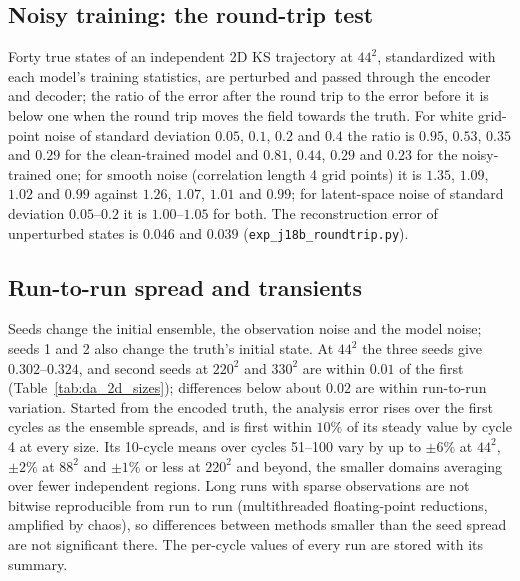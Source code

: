 \subsection{Noisy training: the round-trip test}
\label{app:da_roundtrip}

Forty true states of an independent 2D KS trajectory at $44^2$, standardized with each model's training
statistics, are perturbed and passed through the encoder and decoder; the ratio of the error after the
round trip to the error before it is below one when the round trip moves the field towards the truth.
For white grid-point noise of standard deviation $0.05$, $0.1$, $0.2$ and $0.4$ the ratio is $0.95$, $0.53$, $0.35$
and $0.29$ for the clean-trained model and $0.81$, $0.44$, $0.29$ and $0.23$ for the noisy-trained one; for
smooth noise (correlation length 4 grid points) it is $1.35$, $1.09$, $1.02$ and $0.99$ against $1.26$, $1.07$,
$1.01$ and $0.99$; for latent-space noise of standard deviation $0.05$--$0.2$ it is $1.00$--$1.05$ for both. The
reconstruction error of unperturbed states is $0.046$ and $0.039$ (\texttt{exp\_j18b\_roundtrip.py}).

\subsection{Run-to-run spread and transients}
\label{app:da_tuning}

Seeds change the initial ensemble, the observation noise and the model noise; seeds 1 and 2 also
change the truth's initial state. At $44^2$ the three seeds give $0.302$--$0.324$, and second seeds at $220^2$
and $330^2$ are within $0.01$ of the first (Table~\ref{tab:da_2d_sizes}); differences below about $0.02$ are
within run-to-run variation. Started from the encoded truth, the analysis error rises over the first
cycles as the ensemble spreads, and is first within $10\%$ of its steady value by cycle 4 at every size.
Its 10-cycle means over cycles 51--100 vary by up to $\pm6\%$ at $44^2$, $\pm2\%$ at $88^2$ and $\pm1\%$ or less at $220^2$ and
beyond, the smaller domains averaging over fewer independent regions. Long runs with sparse
observations are not bitwise reproducible from run to run (multithreaded floating-point reductions,
amplified by chaos), so differences between methods smaller than the seed spread are not
significant there. The per-cycle values of every run are stored with its summary.

